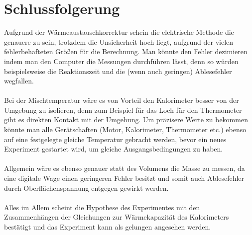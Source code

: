 \documentclass[bibliography=totocnumbered]{scrartcl}
\begin{document}
	\section{Schlussfolgerung}
	Aufgrund der Wärmeaustauschkorrektur schein die elektrische Methode die genauere zu sein,
	trotzdem die Unsicherheit hoch liegt, aufgrund der vielen fehlerbehafteten Größen für die
	Berechnung. Man könnte den Fehler dezimieren indem man den Computer die Messungen
	durchführen lässt, denn so würden beispielsweise die Reaktionszeit und die (wenn auch geringen)
	Ablesefehler wegfallen.\\\\
	Bei der Mischtemperatur wäre es von Vorteil den Kalorimeter besser von der Umgebung zu isolieren,
	denn zum Beispiel für das Loch für den Thermometer gibt es direkten Kontakt mit der Umgebung.
	Um präzisere Werte zu bekommen könnte man alle Gerätschaften (Motor, Kalorimeter, Thermometer
	etc.) ebenso auf eine festgelegte gleiche Temperatur gebracht werden, bevor ein neues Experiment
	gestartet wird, um gleiche Ausgangsbedingungen zu haben.\\\\
	Allgemein wäre es ebenso genauer statt des Volumens die Masse zu messen, da eine digitale Wage
	einen geringeren Fehler besitzt und somit auch Ablesefehler durch Oberflächenspannung entgegen
	gewirkt werden.\\\\
	Alles im Allem scheint die Hypothese des Experimentes mit den Zusammenhängen der Gleichungen
	zur Wärmekapazität des Kalorimeters bestätigt und das Experiment kann als gelungen angesehen
	werden. 
	
	
	
	
\end{document}
